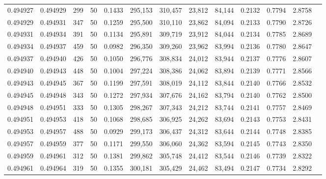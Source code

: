 \begin{tabular}{rrrrrrrrrrrrr}
0.494927 & 0.494929 &   299 &  50 &                                     0.1433 & 295,153 & 310,457 &  23,812 &  84,144 & 0.2132 & 0.7794 & 2.8758 \\
0.494929 & 0.494931 &   347 &  50 &                                     0.1259 & 295,500 & 310,110 &  23,862 &  84,094 & 0.2133 & 0.7790 & 2.8726 \\
0.494931 & 0.494934 &   391 &  50 &                                     0.1134 & 295,891 & 309,719 &  23,912 &  84,044 & 0.2134 & 0.7785 & 2.8689 \\
0.494934 & 0.494937 &   459 &  50 &                                     0.0982 & 296,350 & 309,260 &  23,962 &  83,994 & 0.2136 & 0.7780 & 2.8647 \\
0.494937 & 0.494940 &   426 &  50 &                                     0.1050 & 296,776 & 308,834 &  24,012 &  83,944 & 0.2137 & 0.7776 & 2.8607 \\
0.494940 & 0.494943 &   448 &  50 &                                     0.1004 & 297,224 & 308,386 &  24,062 &  83,894 & 0.2139 & 0.7771 & 2.8566 \\
0.494943 & 0.494945 &   367 &  50 &                                     0.1199 & 297,591 & 308,019 &  24,112 &  83,844 & 0.2140 & 0.7766 & 2.8532 \\
0.494945 & 0.494948 &   343 &  50 &                                     0.1272 & 297,934 & 307,676 &  24,162 &  83,794 & 0.2140 & 0.7762 & 2.8500 \\
0.494948 & 0.494951 &   333 &  50 &                                     0.1305 & 298,267 & 307,343 &  24,212 &  83,744 & 0.2141 & 0.7757 & 2.8469 \\
0.494951 & 0.494953 &   418 &  50 &                                     0.1068 & 298,685 & 306,925 &  24,262 &  83,694 & 0.2143 & 0.7753 & 2.8431 \\
0.494953 & 0.494957 &   488 &  50 &                                     0.0929 & 299,173 & 306,437 &  24,312 &  83,644 & 0.2144 & 0.7748 & 2.8385 \\
0.494957 & 0.494959 &   377 &  50 &                                     0.1171 & 299,550 & 306,060 &  24,362 &  83,594 & 0.2145 & 0.7743 & 2.8350 \\
0.494959 & 0.494961 &   312 &  50 &                                     0.1381 & 299,862 & 305,748 &  24,412 &  83,544 & 0.2146 & 0.7739 & 2.8322 \\
0.494961 & 0.494964 &   319 &  50 &                                     0.1355 & 300,181 & 305,429 &  24,462 &  83,494 & 0.2147 & 0.7734 & 2.8292 \\

\end{tabular}
